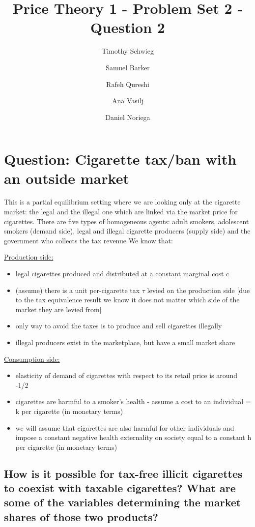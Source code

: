 \documentclass{article}
\title{Price Theory 1 - Problem Set 2 - Question 2}
\author{Timothy Schwieg \and Samuel Barker \and Rafeh Qureshi \and Ana Vasilj
 \and Daniel Noriega}
\begin{document}
\maketitle

\section{Question: Cigarette tax/ban with an outside market}

This is a partial equilibrium setting where we are looking only at the
cigarette market: the legal and the illegal one which are linked via
the market price for cigarettes. There are five types of homogeneous
agents: adult smokers, adolescent smokers (demand side), legal and
illegal cigarette producers (supply side) and the government who
collects the tax revenue We know that:

\underline{Production side:}
\begin{itemize}
\item legal cigarettes produced and distributed at a constant marginal
  cost c
\item (assume) there is a unit per-cigarette tax $\tau$ levied on the
  production side [due to the tax equivalence result we know it does
  not matter which side of the market they are levied from]
\item only way to avoid the taxes is to produce and sell cigarettes
  illegally
\item illegal producers exist in the marketplace, but have a small
  market share
\end{itemize}

\underline{Consumption side:}
\begin{itemize}
\item elasticity of demand of cigarettes with respect to its retail
  price is around -1/2
\item cigarettes are harmful to a smoker's health - assume a cost to
  an individual = k per cigarette (in monetary terms)
\item we will assume that cigarettes are also harmful for other
  individuals and impose a constant negative health externality on
  society equal to a constant h per cigarette (in monetary terms)
\end{itemize}



\subsection{How is it possible for tax-free illicit cigarettes to
  coexist with taxable cigarettes? What are some of the variables
  determining the market shares of those two products?}
\end{document}
